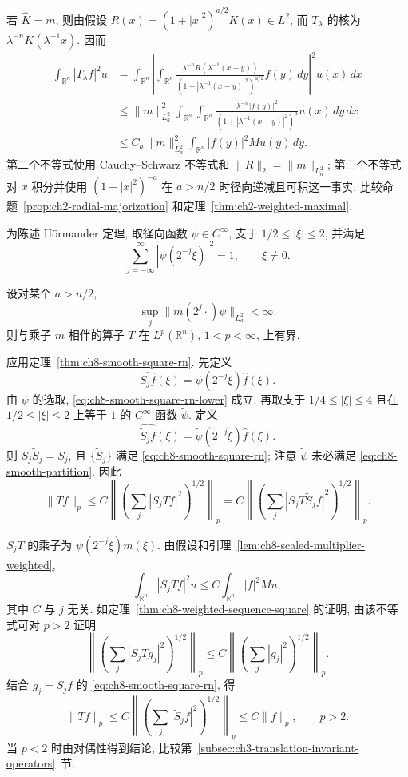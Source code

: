 \begin{Proof}
若 $\widehat K=m$, 则由假设 $R(x)=(1+|x|^2)^{a/2}K(x)\in L^2$, 而 $T_\lambda$ 的核为 $\lambda^{-n}K(\lambda^{-1}x)$. 因而
\[
\begin{aligned}
 \int_{\mathbb R^n}|T_\lambda f|^2u
 &=\int_{\mathbb R^n}\left|\int_{\mathbb R^n}
 \frac{\lambda^{-n}R(\lambda^{-1}(x-y))}
 {(1+|\lambda^{-1}(x-y)|^2)^{a/2}}f(y)\,dy\right|^2u(x)\,dx\\
 &\le\|m\|_{L_a^2}^2
 \int_{\mathbb R^n}\int_{\mathbb R^n}
 \frac{\lambda^{-n}|f(y)|^2}{(1+|\lambda^{-1}(x-y)|^2)^a}u(x)\,dy\,dx\\
 &\le C_a\|m\|_{L_a^2}^2\int_{\mathbb R^n}|f(y)|^2Mu(y)\,dy.
\end{aligned}
\]
第二个不等式使用 Cauchy--Schwarz 不等式和 $\|R\|_2=\|m\|_{L_a^2}$; 第三个不等式对 $x$ 积分并使用 $(1+|x|^2)^{-a}$ 在 $a>n/2$ 时径向递减且可积这一事实, 比较命题~\ref{prop:ch2-radial-majorization} 和定理~\ref{thm:ch2-weighted-maximal}.
\end{Proof}

为陈述 Hörmander 定理, 取径向函数 $\psi\in C^\infty$, 支于 $1/2\le|\xi|\le2$, 并满足
\[
 \sum_{j=-\infty}^{\infty}|\psi(2^{-j}\xi)|^2=1,
 \qquad\xi\ne0.
\]

\begin{Theorem}[Hörmander]
\label{thm:ch8-hormander-multiplier}
设对某个 $a>n/2$,
\[
 \sup_j\|m(2^j\cdot)\psi\|_{L_a^2}<\infty.
\]
则与乘子 $m$ 相伴的算子 $T$ 在 $L^p(\mathbb R^n)$, $1<p<\infty$, 上有界.
\end{Theorem}

\begin{Proof}
应用定理~\ref{thm:ch8-smooth-square-rn}. 先定义
\[
 \widehat{S_jf}(\xi)=\psi(2^{-j}\xi)\widehat f(\xi).
\]
由 $\psi$ 的选取, \eqref{eq:ch8-smooth-square-rn-lower} 成立. 再取支于 $1/4\le|\xi|\le4$ 且在 $1/2\le|\xi|\le2$ 上等于 $1$ 的 $C^\infty$ 函数 $\widetilde\psi$. 定义
\[
 \widehat{\widetilde S_jf}(\xi)=\widetilde\psi(2^{-j}\xi)\widehat f(\xi).
\]
则 $S_j\widetilde S_j=S_j$, 且 $\{\widetilde S_j\}$ 满足 \eqref{eq:ch8-smooth-square-rn}; 注意 $\widetilde\psi$ 未必满足 \eqref{eq:ch8-smooth-partition}. 因此
\[
 \|Tf\|_p
 \le C\left\|\left(\sum_j|S_jTf|^2\right)^{1/2}\right\|_p
 =C\left\|\left(\sum_j|S_jT\widetilde S_jf|^2\right)^{1/2}\right\|_p.
\]

\hypertarget{chapter-08-page-177}{}
$S_jT$ 的乘子为 $\psi(2^{-j}\xi)m(\xi)$. 由假设和引理~\ref{lem:ch8-scaled-multiplier-weighted},
\[
 \int_{\mathbb R^n}|S_jTf|^2u
 \le C\int_{\mathbb R^n}|f|^2Mu,
\]
其中 $C$ 与 $j$ 无关. 如定理~\ref{thm:ch8-weighted-sequence-square} 的证明, 由该不等式可对 $p>2$ 证明
\[
 \left\|\left(\sum_j|S_jTg_j|^2\right)^{1/2}\right\|_p
 \le C\left\|\left(\sum_j|g_j|^2\right)^{1/2}\right\|_p.
\]
结合 $g_j=\widetilde S_jf$ 的 \eqref{eq:ch8-smooth-square-rn}, 得
\[
 \|Tf\|_p
 \le C\left\|\left(\sum_j|\widetilde S_jf|^2\right)^{1/2}\right\|_p
 \le C\|f\|_p,
 \qquad p>2.
\]
当 $p<2$ 时由对偶性得到结论, 比较第~\ref{subsec:ch3-translation-invariant-operators}~节.
\end{Proof}

